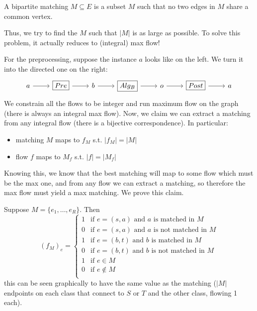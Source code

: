\begin{definition}[Matching]
    A bipartite matching $M \subseteq E$ is a subset $M$ such that no two edges in $M$ share a common vertex.
\end{definition}

Thus, we try to find the $M$ such that $|M|$ is as large as possible. To solve this problem, it actually reduces to (integral) max flow!

\begin{algothm}
    For the preprocessing, suppose the instance $a$ looks like on the left. We turn it into the directed one on the right:
    \[\begin{tikzcd}
        a & {\boxed{Pre}} & b & {\boxed{Alg_B}} & o & {\boxed{Post}} & a
        \arrow[from=1-1, to=1-2]
        \arrow[from=1-2, to=1-3]
        \arrow[from=1-3, to=1-4]
        \arrow[from=1-4, to=1-5]
        \arrow[from=1-5, to=1-6]
        \arrow[from=1-6, to=1-7]
    \end{tikzcd}\]
    We constrain all the flows to be integer and run maximum flow on the graph (there is always an integral max flow). Now,
    we claim we can extract a matching from any integral flow (there is a bijective correspondence). In particular:
    \begin{itemize}
        \item matching $M$ maps to $f_M$ s.t. $|f_M| = |M|$
        \item flow $f$ maps to $M_f$ s.t. $|f| = |M_f|$
    \end{itemize}
    Knowing this, we know that the best matching will map to some flow which must be the max one, and from any flow we can extract a matching, so therefore
    the max flow must yield a max matching. We prove this claim.
    \begin{proof*}
        Suppose $M = \{e_1, \dots, e_R\}$. Then \[(f_M)_e = \begin{cases}
            1 & \text{if $e = (s,a)$ and $a$ is matched in $M$} \\
            0 & \text{if $e = (s,a)$ and $a$ is not matched in $M$} \\
            1 & \text{if $e = (b,t)$ and $b$ is matched in $M$} \\
            0 & \text{if $e = (b,t)$ and $b$ is not matched in $M$} \\
            1 & \text{if $e \in M$} \\
            0 & \text{if $e \notin M$} \\
        \end{cases}\]
        this can be seen graphically to have the same value as the matching ($|M|$ endpoints on each class that connect to $S$ or $T$ and the other class, flowing 1 each).


\end{proof*}
\end{algothm}

